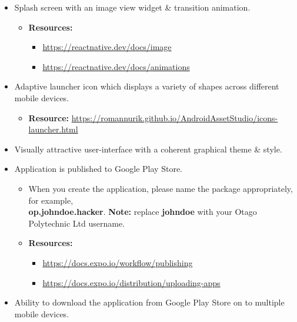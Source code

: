 \documentclass{article}
\begin{document}
\begin{itemize}
\begin{itemize}
    \end{itemize}
    \item Splash screen with an image view widget \& transition animation.
    \begin{itemize}
        \item \textbf{Resources:}
        \begin{itemize}
            \item \footnotesize\href{https://reactnative.dev/docs/image}{https://reactnative.dev/docs/image}
            \item \footnotesize\href{https://reactnative.dev/docs/animations}{https://reactnative.dev/docs/animations}
        \end{itemize}
    \end{itemize}
    \item Adaptive launcher icon which displays a variety of shapes across different mobile devices.
    \begin{itemize}
        \item \textbf{Resource:} \footnotesize\href{https://romannurik.github.io/AndroidAssetStudio/icons-launcher.html}{https://romannurik.github.io/AndroidAssetStudio/icons-launcher.html} 
    \end{itemize}
    \item Visually attractive user-interface with a coherent graphical theme \& style.
    \item Application is published to Google Play Store.
    \begin{itemize}
        \item When you create the application, please name the package appropriately, for example, \\ \textbf{op.johndoe.hacker}. \textbf{Note:} replace \textbf{johndoe} with your Otago Polytechnic Ltd username.
        \item \textbf{Resources:}
        \begin{itemize}
            \item \footnotesize\href{https://docs.expo.io/workflow/publishing}{https://docs.expo.io/workflow/publishing}
            \item \footnotesize\href{https://docs.expo.io/distribution/uploading-apps}{https://docs.expo.io/distribution/uploading-apps}
        \end{itemize}
    \end{itemize}
    \item Ability to download the application from Google Play Store on to multiple mobile devices.
\end{itemize}
\end{document}
